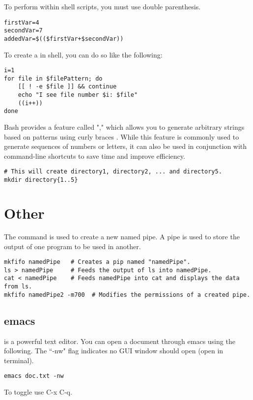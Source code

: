 To perform  within shell scripts, you must use double parenthesis.
\begin{lstlisting}
firstVar=4
secondVar=7
addedVar=$(($firstVar+$secondVar))
\end{lstlisting}

To create a  in shell, you can do so like the following:
\begin{lstlisting}
i=1
for file in $filePattern; do
	[[ ! -e $file ]] && continue
	echo "I see file number $i: $file"
	((i++))
done
\end{lstlisting}

Bash provides a feature called "," which allows you to generate arbitrary strings based on patterns using curly braces {}. While this feature is commonly used to generate sequences of numbers or letters, it can also be used in conjunction with command-line shortcuts to save time and improve efficiency.
\begin{lstlisting}
# This will create directory1, directory2, ... and directory5.
mkdir directory{1..5}
\end{lstlisting}




\section{Other}
\lstset{language=Bash, style=terminalstyle}

The  command is used to create a new named pipe. A pipe is used to store the output of one program to be used in another.
\begin{lstlisting}
mkfifo namedPipe   # Creates a pip named "namedPipe".
ls > namedPipe     # Feeds the output of ls into namedPipe.
cat < namedPipe    # Feeds namedPipe into cat and displays the data from ls.
mkfifo namedPipe2 -m700  # Modifies the permissions of a created pipe.
\end{lstlisting}

\subsection{emacs}
 is a powerful text editor. You can open a document through emacs using the following. The ``-nw" flag indicates no GUI window should open (open in terminal).
\begin{lstlisting}
emacs doc.txt -nw
\end{lstlisting}
To toggle  use C-x C-q.
